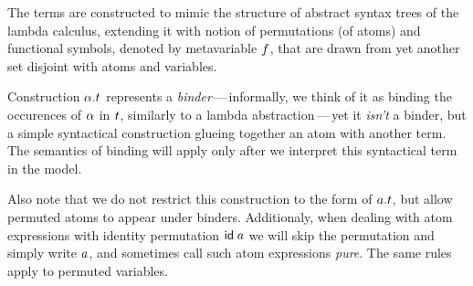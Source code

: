 \documentclass[english, mgr]{iithesis}
\renewcommand{\it}[1]{\textit{#1}}
\newcommand{\mdash}{\,---\,}
\def\-{{\mdash}}
\begin{document}
The terms are constructed to mimic the structure of abstract syntax trees of the lambda calculus,
extending it with notion of permutations (of atoms) and functional symbols,
denoted by metavariable $f$,
that are drawn from yet another set disjoint with atoms and variables.

Construction $\alpha. t$ represents a \it{binder}\-informally, we think of it as binding the occurences of $\alpha$ in $t$,
similarly to a lambda abstraction\-yet it \it{isn't} a binder,
but a simple syntactical construction glueing together an atom with another term.
The semantics of binding will apply only after we interpret this syntactical term in the model.

Also note that we do not restrict this construction to the form of $a. t$,
but allow permuted atoms to appear under binders.
Additionaly, when dealing with atom expressions with identity permutation $\mathsf{id} \;a$
we will skip the permutation and simply write $a$,
and sometimes call such atom expressions \it{pure}.
The same rules apply to permuted variables.
\end{document}
